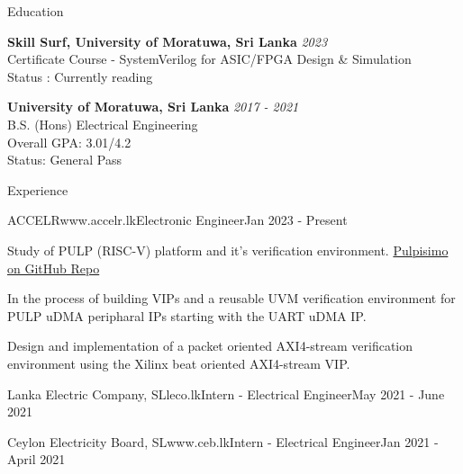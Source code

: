 \documentclass[
	11pt, %
]{resume} %
\begin{document}
\begin{rSection}{Education}

	\textbf{Skill Surf, University of Moratuwa, Sri Lanka} \hfill \textit{2023} \\ 
	Certificate Course - SystemVerilog for ASIC/FPGA Design \& Simulation \\
	Status : Currently reading

	\textbf{University of Moratuwa, Sri Lanka} \hfill \textit{2017 - 2021} \\ 
	B.S. (Hons) Electrical Engineering \\
	Overall GPA: 3.01/4.2 \\
	Status: General Pass
	
\end{rSection}


\begin{rSection}{Experience}

	\begin{rSubsectionX}{ACCELR}{www.accelr.lk}{Electronic Engineer}{Jan 2023 - Present}
		\item Study of PULP (RISC-V) platform and it's verification environment. \href{https://github.com/pulp-platform/pulpissimo}{Pulpisimo on GitHub Repo}
		\item In the process of building VIPs and a reusable UVM verification environment for PULP uDMA peripharal IPs starting with the UART uDMA IP.
		\item Design and implementation of a packet oriented AXI4-stream verification environment using the Xilinx beat oriented AXI4-stream VIP.
	\end{rSubsectionX}

	\begin{rSubsectionSimpleX}{Lanka Electric Company, SL}{leco.lk}{Intern - Electrical Engineer}{May 2021 - June 2021}
	\end{rSubsectionSimpleX}

	\begin{rSubsectionSimpleX}{Ceylon Electricity Board, SL}{www.ceb.lk}{Intern - Electrical Engineer}{Jan 2021 - April 2021}
	\end{rSubsectionSimpleX}

\end{rSection}
\end{document}
